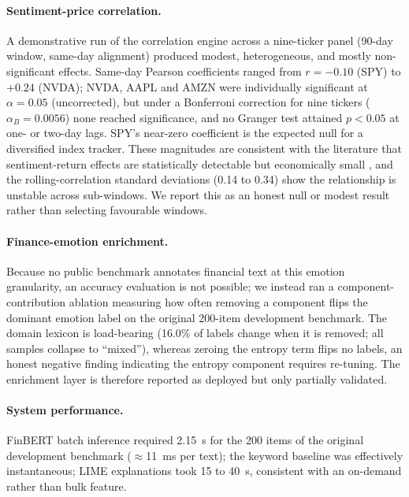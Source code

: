 \documentclass{aims}
\numberwithin{equation}{section}
\begin{document}
\paragraph{Sentiment-price correlation.}
A demonstrative run of the correlation engine across a nine-ticker panel (90-day
window, same-day alignment) produced modest, heterogeneous, and mostly
non-significant effects. Same-day Pearson coefficients ranged from $r = -0.10$ (SPY)
to $+0.24$ (NVDA); NVDA, AAPL and AMZN were individually significant at
$\alpha = 0.05$ (uncorrected), but under a Bonferroni correction for nine tickers
($\alpha_B = 0.0056$) none reached significance, and no Granger test attained
$p < 0.05$ at one- or two-day lags. SPY's near-zero coefficient is the expected null
for a diversified index tracker. These magnitudes are consistent with the literature
that sentiment-return effects are statistically detectable but economically small
\citep{tetlock2007,kraaijeveld2020}, and the rolling-correlation standard deviations
(0.14 to 0.34) show the relationship is unstable across sub-windows. We report this
as an honest null or modest result rather than selecting favourable windows.

\paragraph{Finance-emotion enrichment.}
Because no public benchmark annotates financial text at this emotion granularity, an
accuracy evaluation is not possible; we instead ran a component-contribution
ablation measuring how often removing a component flips the dominant emotion label on
the original 200-item development benchmark. The domain lexicon is load-bearing (16.0\% of labels change
when it is removed; all samples collapse to ``mixed''), whereas zeroing the entropy
term flips no labels, an honest negative finding indicating the entropy component
requires re-tuning. The enrichment layer is therefore reported as deployed but only
partially validated.

\paragraph{System performance.}
FinBERT batch inference required 2.15~s for the 200 items of the original development benchmark ($\approx$11~ms per text);
the keyword baseline was effectively instantaneous; LIME explanations took 15 to
40~s, consistent with an on-demand rather than bulk feature.

\end{document}
